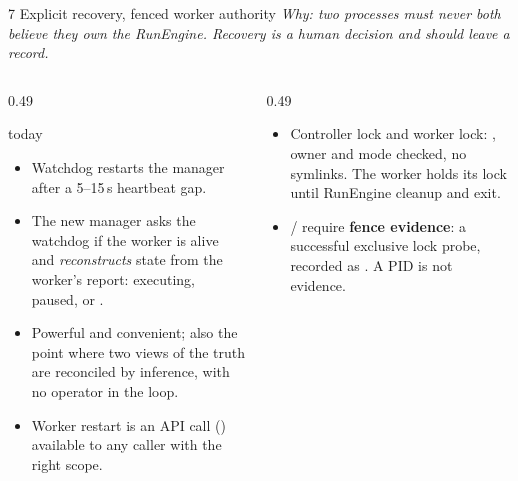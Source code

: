 \begin{frame}{7 \quad Explicit recovery, fenced worker authority}
    {\footnotesize\itshape Why: two processes must never both believe they own the RunEngine. Recovery is a human
    decision and should leave a record.}
    \vspace{0.05cm}
    \begin{columns}[T]
        \begin{column}{0.49\textwidth}
            \begin{alertblock}{\legacy{} today}
                \footnotesize
                \begin{itemize}
                    \item Watchdog restarts the manager after a 5--15\,s heartbeat gap.
                    \item The new manager asks the watchdog if the worker is alive and
                          \emph{reconstructs} state from the worker's report: executing, paused, or
                          . 
                    \item Powerful and convenient; also the point where two views of the truth are
                          reconciled by inference, with no operator in the loop.
                    \item Worker restart is an API call () available to any
                          caller with the right scope.
                \end{itemize}
            \end{alertblock}
        \end{column}
        \begin{column}{0.49\textwidth}
            \begin{block}{\vtwo{}}
                \footnotesize
                \begin{itemize}
                    \item Controller lock and worker lock: , owner and mode checked, no symlinks.
                          The worker holds its lock until RunEngine cleanup and exit.
                    \item {}/ require \textbf{fence evidence}: a successful exclusive
                          lock probe, recorded as . A PID is not evidence.

\end{itemize}
\end{block}
\end{column}
\end{columns}
\end{frame}
